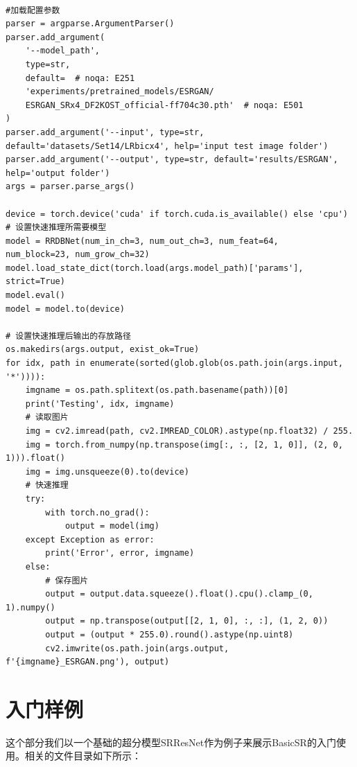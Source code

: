 \documentclass[../main.tex]{subfiles}
\begin{document}
\begin{verbatim}

#加载配置参数
parser = argparse.ArgumentParser()
parser.add_argument(
    '--model_path',
    type=str,
    default=  # noqa: E251
    'experiments/pretrained_models/ESRGAN/
    ESRGAN_SRx4_DF2KOST_official-ff704c30.pth'  # noqa: E501
)
parser.add_argument('--input', type=str,
default='datasets/Set14/LRbicx4', help='input test image folder')
parser.add_argument('--output', type=str, default='results/ESRGAN',
help='output folder')
args = parser.parse_args()

device = torch.device('cuda' if torch.cuda.is_available() else 'cpu')
# 设置快速推理所需要模型
model = RRDBNet(num_in_ch=3, num_out_ch=3, num_feat=64,
num_block=23, num_grow_ch=32)
model.load_state_dict(torch.load(args.model_path)['params'], strict=True)
model.eval()
model = model.to(device)

# 设置快速推理后输出的存放路径
os.makedirs(args.output, exist_ok=True)
for idx, path in enumerate(sorted(glob.glob(os.path.join(args.input, '*')))):
    imgname = os.path.splitext(os.path.basename(path))[0]
    print('Testing', idx, imgname)
    # 读取图片
    img = cv2.imread(path, cv2.IMREAD_COLOR).astype(np.float32) / 255.
    img = torch.from_numpy(np.transpose(img[:, :, [2, 1, 0]], (2, 0, 1))).float()
    img = img.unsqueeze(0).to(device)
    # 快速推理
    try:
        with torch.no_grad():
            output = model(img)
    except Exception as error:
        print('Error', error, imgname)
    else:
        # 保存图片
        output = output.data.squeeze().float().cpu().clamp_(0, 1).numpy()
        output = np.transpose(output[[2, 1, 0], :, :], (1, 2, 0))
        output = (output * 255.0).round().astype(np.uint8)
        cv2.imwrite(os.path.join(args.output, f'{imgname}_ESRGAN.png'), output)
\end{verbatim}

\section{入门样例}

这个部分我们以一个基础的超分模型SRResNet作为例子来展示BasicSR的入门使用。相关的文件目录如下所示：
\end{document}
